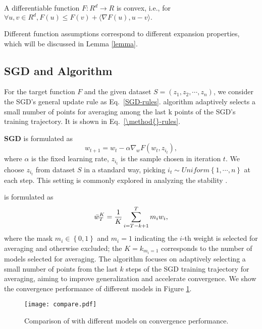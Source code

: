 \begin{assumption}
\label{Convex function}
A differentiable function $F: R^d \rightarrow R$ is convex, i.e., for $\forall u, v \in R^d, F(u) \leq F(v) + \langle\nabla F(u), u-v \rangle.$
\end{assumption}

Different function assumptions correspond to different expansion properties, which will be discussed in Lemma \ref{lemma}.

\subsection{SGD and \method{} Algorithm}
For the target function $F$ and the given dataset $S=(z_1, z_2, \cdots, z_n)$, we consider the SGD's general update rule as Eq.~\eqref{SGD-rules}. \method{} algorithm adaptively selects a small number of points for averaging among the last k points of the SGD's training trajectory. It is shown in Eq.~\eqref{\method{}-rules}.

\textbf{SGD} is formulated as
    \begin{equation}\label{SGD-rules}
     w_{t+1} = w_{t} - \alpha \nabla_w F(w_{t},z_{i_t}),
    \end{equation}   
where $\alpha$ is the fixed learning rate, $z_{i_t}$ is the sample chosen in iteration $t$. We choose $z_{i_t}$ from dataset $S$ in a standard way, picking $i_t \sim Uniform\left\{1, \cdots, n \right\}$ at each step. This setting is commonly explored in analyzing the stability \cite{hardt2016train,xiao2022stability}. 

\textbf{\method{}} is formulated as 
\begin{equation}\label{\method{}-rules}
    \bar{w}^{K}_{T}=\frac{1}{K} \sum_{i=T-k+1}^{T} m_{i}w_{i},
\end{equation}
where the mask $m_i \in \left\{0, 1 \right\}$ and $m_i = 1$ indicating the $i$-th weight is selected for averaging and otherwise excluded; the $K = k_{m_i=1}$ corresponds to the number of models selected for averaging. The \method{} algorithm focuses on adaptively selecting a small number of points from the last $k$ steps of the SGD training trajectory for averaging, aiming to improve generalization and accelerate convergence. We show the convergence performance of different
models in Figure \ref{fig:enter-label}.
\begin{figure}
    \centering
    \texttt{[image: compare.pdf]}
    \caption{Comparison of \method{} with different models on convergence performance.}
    \label{fig:enter-label}
\end{figure}


